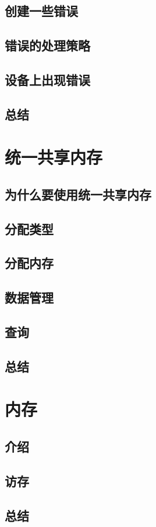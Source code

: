 \documentclass[11pt,a4paper,UTF8]{ctexart}
\begin{document}
		\subsection{创建一些错误}
		\subsection{错误的处理策略}
		\subsection{设备上出现错误}
		\subsection{总结}
	\section{统一共享内存}
		\subsection{为什么要使用统一共享内存}
		\subsection{分配类型}
		\subsection{分配内存}
		\subsection{数据管理}
		\subsection{查询}
		\subsection{总结}
	\section{内存}
		\subsection{介绍}
		\subsection{访存}
		\subsection{总结}
\end{document}
